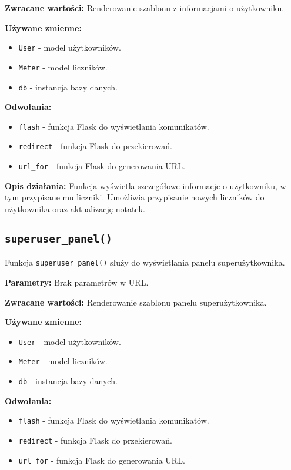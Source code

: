 \documentclass[12pt,a4paper]{report}
\begin{document}
\textbf{Zwracane wartości:} Renderowanie szablonu z informacjami o użytkowniku.

\textbf{Używane zmienne:}
\begin{itemize}
    \item \texttt{User} - model użytkowników.
    \item \texttt{Meter} - model liczników.
    \item \texttt{db} - instancja bazy danych.
\end{itemize}

\textbf{Odwołania:}
\begin{itemize}
    \item \texttt{flash} - funkcja Flask do wyświetlania komunikatów.
    \item \texttt{redirect} - funkcja Flask do przekierowań.
    \item \texttt{url\_for} - funkcja Flask do generowania URL.
\end{itemize}

\textbf{Opis działania:}
Funkcja wyświetla szczegółowe informacje o użytkowniku, w tym przypisane mu liczniki. Umożliwia przypisanie nowych liczników do użytkownika oraz aktualizację notatek.

\subsection{\texttt{superuser\_panel()}}
\label{sec:superuser_panel}
Funkcja \texttt{superuser\_panel()} służy do wyświetlania panelu superużytkownika.

\textbf{Parametry:} Brak parametrów w URL.

\textbf{Zwracane wartości:} Renderowanie szablonu panelu superużytkownika.

\textbf{Używane zmienne:}
\begin{itemize}
    \item \texttt{User} - model użytkowników.
    \item \texttt{Meter} - model liczników.
    \item \texttt{db} - instancja bazy danych.
\end{itemize}

\textbf{Odwołania:}
\begin{itemize}
    \item \texttt{flash} - funkcja Flask do wyświetlania komunikatów.
    \item \texttt{redirect} - funkcja Flask do przekierowań.
    \item \texttt{url\_for} - funkcja Flask do generowania URL.
\end{itemize}
\end{document}
